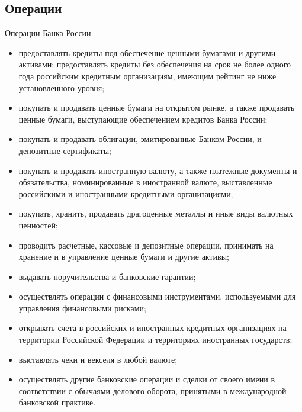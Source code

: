 \documentclass[_DKB_p1_Money.tex]{subfiles}
\begin{document}
\subsection{Операции}
\begin{frame}[ allowframebreaks]{Операции Банка России}
\begin{itemize}
\item
предоставлять кредиты под обеспечение ценными бумагами и другими активами; предоставлять кредиты без обеспечения на срок не более одного года российским кредитным организациям, имеющим рейтинг не ниже установленного уровня;

\pagebreak
\item
покупать и продавать ценные бумаги на открытом рынке, а также продавать ценные бумаги, выступающие обеспечением кредитов Банка России;
\item
покупать и продавать облигации, эмитированные Банком России, и депозитные сертификаты;

\pagebreak
\item
покупать и продавать иностранную валюту, а также платежные документы и обязательства, номинированные в иностранной валюте, выставленные российскими и иностранными кредитными организациями;

\pagebreak
\item
покупать, хранить, продавать драгоценные металлы и иные виды валютных ценностей;
\item
проводить расчетные, кассовые и депозитные операции, принимать на хранение и в управление ценные бумаги и другие активы;

\pagebreak
\item
выдавать поручительства и банковские гарантии;
\item
осуществлять операции с финансовыми инструментами, используемыми для управления финансовыми рисками;

\pagebreak
\item
открывать счета в российских и иностранных кредитных организациях на территории Российской Федерации и территориях иностранных государств;
\item
выставлять чеки и векселя в любой валюте;

\pagebreak
\item
осуществлять другие банковские операции и сделки от своего имени в соответствии с обычаями делового оборота, принятыми в международной банковской практике.
\end{itemize}
\end{frame}
\end{document}
